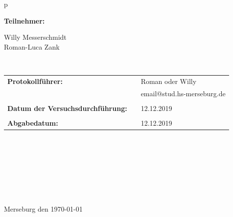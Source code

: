 \begin{center}
\begin{tabular}{p{\textwidth}}
\begin{center}
\Large{\textbf{Teilnehmer:}} \\ 
\end{center}
\begin{center}
\large{Willy Messerschmidt \\
		Roman-Luca Zank} \\
\end{center}


\\

\begin{center}
\begin{tabular}{lll}
\large{\textbf{Protokollführer:}} & & \large{Roman oder Willy} \\
& & email@stud.hs-merseburg.de\\
&&\\
\large{\textbf{Datum der Versuchsdurchführung:}}&& \large{12.12.2019}\\
&&\\
\large{\textbf{Abgabedatum:}}&& \large{12.12.2019}
\end{tabular}
\end{center}

\\ \\ \\ \\ \\ \\ \\ 
\large{Merseburg den \today}

\end{tabular}
\end{center}
